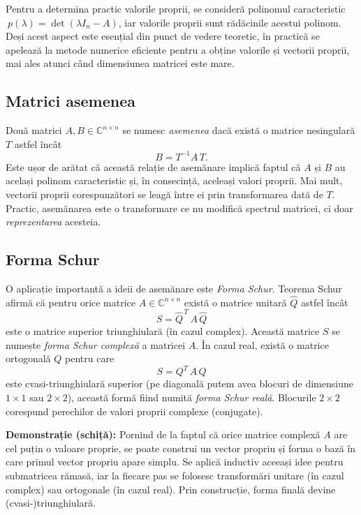 \documentclass{exam}
\begin{document}
Pentru a determina practic valorile proprii, se consideră polinomul caracteristic
\(\ p(\lambda) = \det(\lambda I_n - A)\),
iar valorile proprii sunt rădăcinile acestui polinom. Deși acest aspect este esențial din punct de vedere teoretic, în practică se apelează la metode numerice eficiente pentru a obține valorile și vectorii proprii, mai ales atunci când dimensiunea matricei este mare.

\subsection*{Matrici asemenea}

Două matrici \(A, B \in \mathbb{C}^{n \times n}\) se numesc \emph{asemenea} dacă există o matrice nesingulară \(T\) astfel încât
\[
	B = T^{-1} A \, T.
\]
Este ușor de arătat că această relație de asemănare implică faptul că \(A\) și \(B\) au același polinom caracteristic și, în consecință, aceleași valori proprii. Mai mult, vectorii proprii corespunzători se leagă între ei prin transformarea dată de \(T\). Practic, asemănarea este o transformare ce nu modifică spectrul matricei, ci doar \emph{reprezentarea} acesteia.

\subsection*{Forma Schur}

O aplicație importantă a ideii de asemănare este \emph{Forma Schur}. Teorema Schur afirmă că pentru orice matrice \(A \in \mathbb{C}^{n\times n}\) există o matrice unitară \(\widehat{Q}\) astfel încât
\[
	S = \widehat{Q}^{\,T} \,A\, \widehat{Q}
\]
este o matrice superior triunghiulară (în cazul complex). Această matrice \(S\) se numește \emph{forma Schur complexă} a matricei \(A\). În cazul real, există o matrice ortogonală \(Q\) pentru care
\[
	S = Q^T \, A \, Q
\]
este cvasi-triunghiulară superior (pe diagonală putem avea blocuri de dimensiune \(1 \times 1\) sau \(2 \times 2\)), această formă fiind numită \emph{forma Schur reală}. Blocurile \(2\times 2\) corespund perechilor de valori proprii complexe (conjugate).

\textbf{Demonstrație (schiță):} Pornind de la faptul că orice matrice complexă \(A\) are cel puțin o valoare proprie, se poate construi un vector propriu și forma o bază în care primul vector propriu apare simplu. Se aplică inductiv aceeași idee pentru submatricea rămasă, iar la fiecare pas se folosesc transformări unitare (în cazul complex) sau ortogonale (în cazul real). Prin construcție, forma finală devine (cvasi-)triunghiulară.
\end{document}
